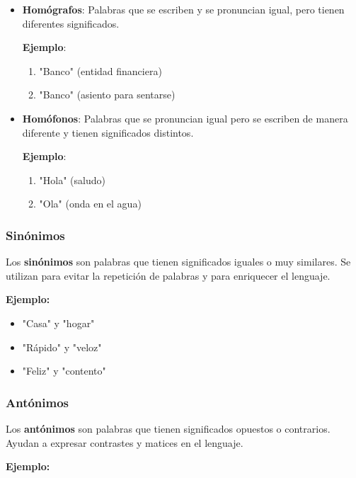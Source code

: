 \begin{itemize}
      \item \textbf{Homógrafos}: Palabras que se escriben y se pronuncian igual, pero tienen diferentes significados.

            \textbf{Ejemplo}:
            \begin{enumerate}
                  \item "Banco" (entidad financiera)
                  \item "Banco" (asiento para sentarse)
            \end{enumerate}

      \item \textbf{Homófonos}: Palabras que se pronuncian igual pero se escriben de manera diferente y tienen significados distintos.

            \textbf{Ejemplo}:
            \begin{enumerate}
                  \item "Hola" (saludo)
                  \item "Ola" (onda en el agua)
            \end{enumerate}
\end{itemize}

\subsubsection{Sinónimos}

Los \textbf{sinónimos} son palabras que tienen significados iguales o muy similares. Se utilizan para evitar la repetición de palabras y para enriquecer el lenguaje.

\textbf{Ejemplo:}

\begin{itemize}
      \item "Casa" y "hogar"
      \item "Rápido" y "veloz"
      \item "Feliz" y "contento"
\end{itemize}

\subsubsection{Antónimos}

Los \textbf{antónimos} son palabras que tienen significados opuestos o contrarios. Ayudan a expresar contrastes y matices en el lenguaje.

\textbf{Ejemplo:}

